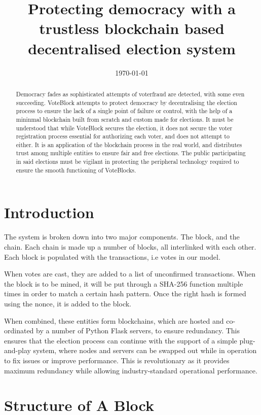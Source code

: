 \documentclass{article}
\title{Protecting democracy with a trustless blockchain based decentralised election system}
\date{\today}
\begin{document}
	\maketitle
	\begin{abstract}
		Democracy fades as sophisticated attempts of voterfraud are detected, with some even succeeding. VoteBlock attempts to protect democracy by decentralising the election process to ensure the lack of a single point of failure or control, with the help of a mininmal blockchain built from scratch and custom made for elections. It must be understood that while VoteBlock secures the election, it does not secure the voter registration process essential for authorizing each voter, and does not attempt to either. It is an application of the blockchain process in the real world, and distributes trust among multiple entities to ensure fair and free elections. The public participating in said elections must be vigilant in protecting the peripheral technology required to ensure the smooth functioning of VoteBlocks.
	\end{abstract}
	\pagebreak
	\tableofcontents
	\pagebreak
	\section{Introduction}
	The system is broken down into two major components. The block, and the chain. Each chain is made up a number of blocks, all interlinked with each other. Each block is populated with the transactions, i.e votes in our model.
	
	When votes are cast, they are added to a list of unconfirmed transactions. When the block is to be mined, it will be put through a SHA-256 function multiple times in order to match a certain hash pattern. Once the right hash is formed using the nonce, it is added to the block. 
	
	When combined, these entities form blockchains, which are hosted and co-ordinated by a number of Python Flask servers, to ensure redundancy. This ensures that the election process can continue with the support of a simple plug-and-play system, where nodes and servers can be swapped out while in operation to fix issues or improve performance. This is revolutionary as it provides maximum redundancy while allowing industry-standard operational performance. 
	\section{Structure of A Block}
\end{document}
